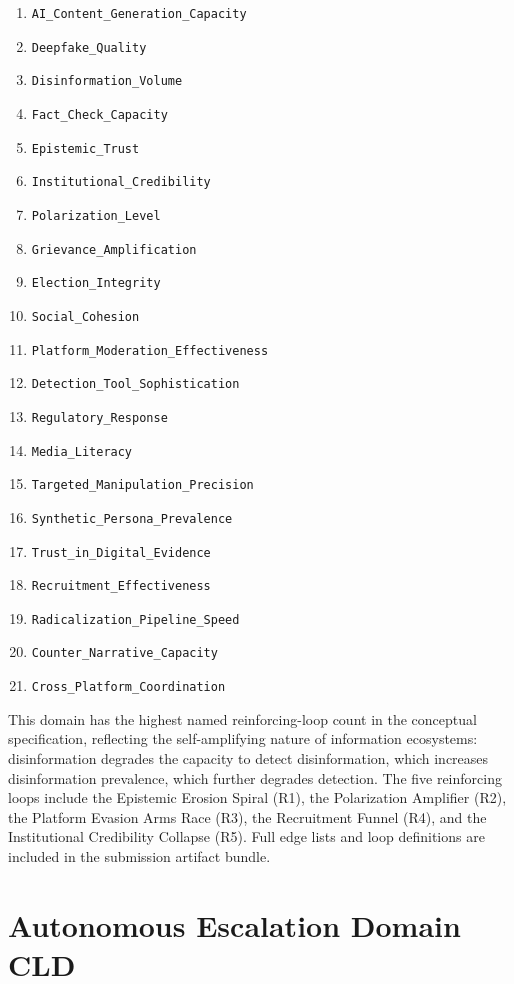 \documentclass[11pt]{article}
\begin{document}
\begin{enumerate}[leftmargin=2em,itemsep=0pt,label=\arabic*.,font=\small]
\item \texttt{AI\_Content\_Generation\_Capacity}
\item \texttt{Deepfake\_Quality}
\item \texttt{Disinformation\_Volume}
\item \texttt{Fact\_Check\_Capacity}
\item \texttt{Epistemic\_Trust}
\item \texttt{Institutional\_Credibility}
\item \texttt{Polarization\_Level}
\item \texttt{Grievance\_Amplification}
\item \texttt{Election\_Integrity}
\item \texttt{Social\_Cohesion}
\item \texttt{Platform\_Moderation\_Effectiveness}
\item \texttt{Detection\_Tool\_Sophistication}
\item \texttt{Regulatory\_Response}
\item \texttt{Media\_Literacy}
\item \texttt{Targeted\_Manipulation\_Precision}
\item \texttt{Synthetic\_Persona\_Prevalence}
\item \texttt{Trust\_in\_Digital\_Evidence}
\item \texttt{Recruitment\_Effectiveness}
\item \texttt{Radicalization\_Pipeline\_Speed}
\item \texttt{Counter\_Narrative\_Capacity}
\item \texttt{Cross\_Platform\_Coordination}
\end{enumerate}

This domain has the highest named reinforcing-loop count in the conceptual specification, reflecting the self-amplifying nature of information ecosystems: disinformation degrades the capacity to detect disinformation, which increases disinformation prevalence, which further degrades detection. The five reinforcing loops include the Epistemic Erosion Spiral (R1), the Polarization Amplifier (R2), the Platform Evasion Arms Race (R3), the Recruitment Funnel (R4), and the Institutional Credibility Collapse (R5). Full edge lists and loop definitions are included in the submission artifact bundle.

\section{Autonomous Escalation Domain CLD}
\label{app:autonomy_cld}
\end{document}
